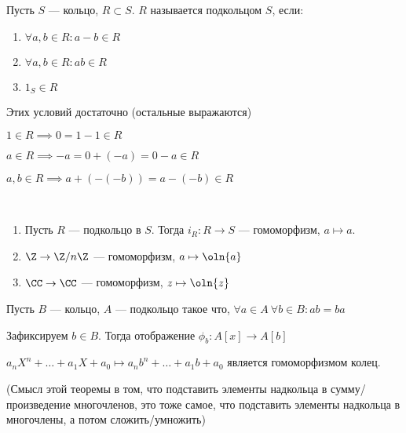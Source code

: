 \begin{defn}
    Пусть $S$ --- кольцо, $R \subset S$. $R$ называется подкольцом $S$, если:

    \begin{enumerate}
        \item $\forall a, b \in R: a - b \in R$
        
        \item $\forall a, b \in R: ab \in R$
        
        \item $1_S \in R$
    \end{enumerate}
\end{defn}

\begin{notice} Этих условий достаточно (остальные выражаются)

    $1 \in R \implies 0 = 1 - 1 \in R$

    $a \in R \implies -a = 0 + (-a) = 0 - a \in R$

    $a, b \in R \implies a + (-(-b)) = a - (-b) \in R$
    
\end{notice}

\begin{examples}~
    
    \begin{enumerate}
        \item Пусть $R$ --- подкольцо в $S$. Тогда $i_R: R \to S$ --- гомоморфизм, $a \mapsto a$.
        
        \item $\Z \to \Z/n\Z$ --- гомоморфизм, $a \mapsto \oln{a}$
        
        \item $\CC \to \CC$ --- гомоморфизм, $z \mapsto \oln{z}$
    \end{enumerate}

\end{examples}

\begin{theorem}
    Пусть $B$ --- кольцо, $A$ --- подкольцо такое что, $\forall a \in A~\forall b \in B: ab = ba$
    
    Зафиксируем $b \in B$. Тогда отображение $\phi_b: A[x] \to A[b]$

    $a_n X^n + \ldots + a_1X + a_0 \mapsto a_n b^n + \ldots + a_1 b + a_0$ является гомоморфизмом колец.

    (Смысл этой теоремы в том, что подставить элементы надкольца в сумму/произведение многочленов, это тоже самое, что подставить элементы надкольца в многочлены, а потом сложить/умножить)
\end{theorem}

